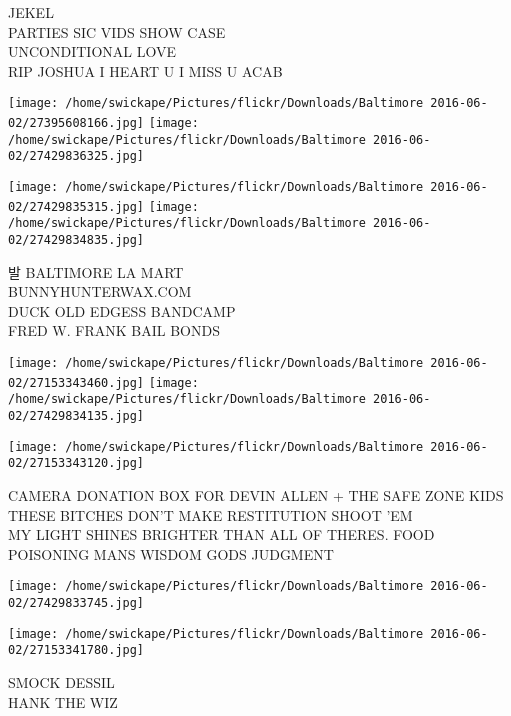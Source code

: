 \documentclass[10pt,letterpaper]{article}
\begin{document}
JEKEL\\
PARTIES SIC VIDS SHOW CASE\\
UNCONDITIONAL LOVE\\
RIP JOSHUA I HEART U I MISS U ACAB
\pagebreak

\texttt{[image: /home/swickape/Pictures/flickr/Downloads/Baltimore 2016-06-02/27395608166.jpg]}
\texttt{[image: /home/swickape/Pictures/flickr/Downloads/Baltimore 2016-06-02/27429836325.jpg]}

\texttt{[image: /home/swickape/Pictures/flickr/Downloads/Baltimore 2016-06-02/27429835315.jpg]}
\texttt{[image: /home/swickape/Pictures/flickr/Downloads/Baltimore 2016-06-02/27429834835.jpg]}

발 BALTIMORE LA MART\\
BUNNYHUNTERWAX.COM\\
DUCK OLD EDGESS BANDCAMP\\
FRED W. FRANK BAIL BONDS
\pagebreak

\texttt{[image: /home/swickape/Pictures/flickr/Downloads/Baltimore 2016-06-02/27153343460.jpg]}
\texttt{[image: /home/swickape/Pictures/flickr/Downloads/Baltimore 2016-06-02/27429834135.jpg]}

\texttt{[image: /home/swickape/Pictures/flickr/Downloads/Baltimore 2016-06-02/27153343120.jpg]}

CAMERA DONATION BOX FOR DEVIN ALLEN + THE SAFE ZONE KIDS\\
THESE BITCHES DON'T MAKE RESTITUTION SHOOT 'EM\\
MY LIGHT SHINES BRIGHTER THAN ALL OF THERES.  FOOD POISONING MANS WISDOM GODS JUDGMENT
\pagebreak

\texttt{[image: /home/swickape/Pictures/flickr/Downloads/Baltimore 2016-06-02/27429833745.jpg]}

\vspace{0.25in}
\texttt{[image: /home/swickape/Pictures/flickr/Downloads/Baltimore 2016-06-02/27153341780.jpg]}

SMOCK DESSIL\\
HANK THE WIZ
\pagebreak
\end{document}
